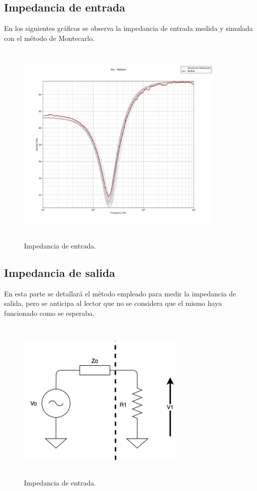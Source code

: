 \subsection{Impedancia de entrada}

En los siguientes gr\'aficos se observa la impedancia de entrada medida y simulada con el m\'etodo de Montecarlo.
\begin{figure}[H] %
	\centering
	\includegraphics[width=10cm,height=10cm,keepaspectratio]{../EJ1/00GRAFICOS/zin_modulo_sinTeorico.png}
	\caption{Impedancia de entrada.}
	\label{zin_mod}
\end{figure}

\subsection{Impedancia de salida}

En esta parte se detallar\'a el m\'etodo empleado para medir la impedancia de salida, pero se anticipa al lector que no se considera que el mismo haya funcionado como se esperaba.
\begin{figure}[H] %
	\centering
	\includegraphics[width=8cm,height=8cm,keepaspectratio]{../EJ1/00GRAFICOS/zout.png}
	\caption{Impedancia de entrada.}
	\label{zout}
\end{figure}